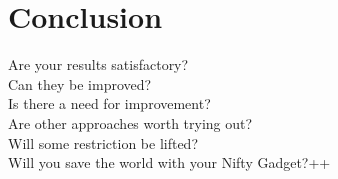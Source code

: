 \newpage
\chapter{Conclusion}
\label{sec:conclusion}



Are your results satisfactory?\\
Can they be improved?\\
Is there a need for improvement?\\
Are other approaches worth trying out?\\
Will some restriction be lifted?\\
Will you save the world with your Nifty Gadget?++
